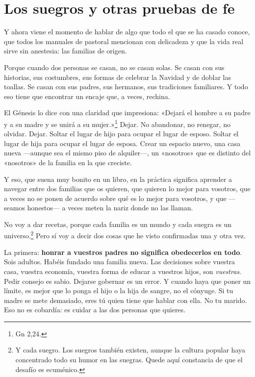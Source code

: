 \section{Los suegros y otras pruebas de fe}

Y ahora viene el momento de hablar de algo que todo el que se ha casado conoce, que todos los manuales de pastoral mencionan con delicadeza y que la vida real sirve sin anestesia: las familias de origen.

Porque cuando dos personas se casan, no se casan solas. Se casan con sus historias, sus costumbres, sus formas de celebrar la Navidad y de doblar las toallas. Se casan con sus padres, sus hermanos, sus tradiciones familiares. Y todo eso tiene que encontrar un encaje que, a veces, rechina.

El Génesis lo dice con una claridad que impresiona: «Dejará el hombre a su padre y a su madre y se unirá a su mujer.»\footnote{Gn 2,24.} Dejar. No abandonar, no renegar, no olvidar. Dejar. Soltar el lugar de hijo para ocupar el lugar de esposo. Soltar el lugar de hija para ocupar el lugar de esposa. Crear un espacio nuevo, una casa nueva ---aunque sea el mismo piso de alquiler---, un «nosotros» que es distinto del «nosotros» de la familia en la que creciste.

Y eso, que suena muy bonito en un libro, en la práctica significa aprender a navegar entre dos familias que os quieren, que quieren lo mejor para vosotros, que a veces no se ponen de acuerdo sobre qué es lo mejor para vosotros, y que ---seamos honestos--- a veces meten la nariz donde no las llaman.

No voy a dar recetas, porque cada familia es un mundo y cada suegra es un universo.\footnote{Y cada suegro. Los suegros también existen, aunque la cultura popular haya concentrado todo su humor en las suegras. Quede aquí constancia de que el desafío es ecuménico.} Pero sí voy a decir dos cosas que he visto confirmadas una y otra vez.

La primera: \textbf{honrar a vuestros padres no significa obedecerlos en todo}. Sois adultos. Habéis fundado una familia nueva. Las decisiones sobre vuestra casa, vuestra economía, vuestra forma de educar a vuestros hijos, son \emph{vuestras}. Pedir consejo es sabio. Dejarse gobernar es un error. Y cuando haya que poner un límite, es mejor que lo ponga el hijo o la hija de sangre, no el cónyuge. Si tu madre se mete demasiado, eres tú quien tiene que hablar con ella. No tu marido. Eso no es cobardía: es cuidar a las dos personas que quieres.

